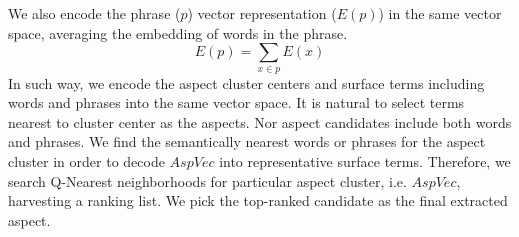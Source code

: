 We also encode the phrase ($p$) vector representation ($E(p)$) in the same vector space, averaging the embedding of words in the phrase. 
\begin{equation}
E(p) = \sum_{x\in p}{E(x)}
\end{equation}
In such way, we encode the aspect cluster centers and surface terms including words and phrases into the same vector space. It is natural to select terms nearest to cluster center as the aspects. 
Nor aspect candidates include both words and phrases. 
We find the semantically nearest words or phrases for the aspect cluster in order to decode $AspVec$ into representative surface terms.
Therefore, we search Q-Nearest neighborhoods for particular aspect cluster, i.e. $AspVec$, harvesting a ranking list.
We pick the top-ranked candidate as the final extracted aspect.










